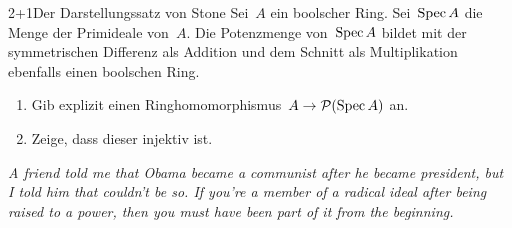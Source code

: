 \documentclass[entwurf]{uebblatt}
\begin{document}
\begin{aufgabe}{2+1}{Der Darstellungssatz von Stone}
Sei~$A$ ein boolscher Ring. Sei~$\operatorname{Spec} A$ die Menge der Primideale von~$A$. Die
Potenzmenge von~$\operatorname{Spec} A$ bildet mit der symmetrischen Differenz als Addition
und dem Schnitt als Multiplikation ebenfalls einen boolschen Ring.
\begin{enumerate}
\item Gib explizit einen Ringhomomorphismus~$A \to \mathcal{P}(\operatorname{Spec} A)$ an.
\item Zeige, dass dieser injektiv ist.
\end{enumerate}
\end{aufgabe}

\centering
\emph{A friend told me that Obama became a communist after he became
president, but I told him that couldn't be so. If you're a member of a
radical ideal after being raised to a power, then you must have been
part of it from the beginning.}
\par
\end{document}
